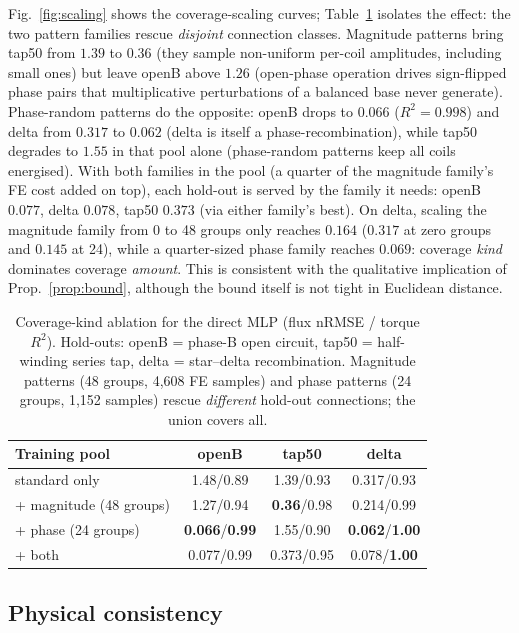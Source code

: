 \documentclass[review]{elsarticle}
\begin{document}
Fig.~\ref{fig:scaling} shows the coverage-scaling curves;
Table~\ref{tab:phase} isolates the effect: the two pattern families rescue
\emph{disjoint} connection
classes. Magnitude patterns bring tap50 from $1.39$ to $0.36$ (they sample
non-uniform per-coil amplitudes, including small ones) but leave openB above
$1.26$ (open-phase operation drives sign-flipped phase pairs that
multiplicative perturbations of a balanced base never generate). Phase-random
patterns do the opposite: openB drops to $0.066$ ($R^2=0.998$) and delta from
$0.317$ to $0.062$ (delta is itself a phase-recombination), while tap50
degrades to $1.55$ in that pool alone (phase-random patterns keep all coils
energised). With both families in the pool (a quarter of the magnitude
family's FE cost added on top), each hold-out is served by the family it
needs: openB $0.077$, delta $0.078$, tap50 $0.373$ (via either family's best).
On delta, scaling the magnitude family from 0 to 48 groups only reaches
$0.164$ ($0.317$ at zero groups and $0.145$ at 24), while a quarter-sized
phase family reaches $0.069$: coverage \emph{kind} dominates coverage
\emph{amount}. This is consistent with the
qualitative implication of Prop.~\ref{prop:bound}, although the bound itself
is not tight in Euclidean distance.

\begin{table}[t]
\centering\small
\caption{Coverage-kind ablation for the direct MLP (flux nRMSE / torque $R^2$). Hold-outs:
openB = phase-B open circuit, tap50 = half-winding series tap, delta =
star--delta recombination. Magnitude patterns (48 groups, 4{,}608 FE
samples) and phase patterns (24 groups, 1{,}152 samples) rescue
\emph{different} hold-out connections; the union covers all.}
\label{tab:phase}
\begin{tabular}{lccc}
\toprule
Training pool & openB & tap50 & delta \\
\midrule
standard only            & 1.48/0.89 & 1.39/0.93 & 0.317/0.93 \\
+ magnitude (48 groups)  & 1.27/0.94 & \textbf{0.36}/0.98 & 0.214/0.99 \\
+ phase (24 groups)      & \textbf{0.066}/\textbf{0.99} & 1.55/0.90 & \textbf{0.062}/\textbf{1.00} \\
+ both                   & 0.077/0.99 & 0.373/0.95 & 0.078/\textbf{1.00} \\
\bottomrule
\end{tabular}
\end{table}

\subsection{Physical consistency}
\label{sec:results:jacobian}
\end{document}
